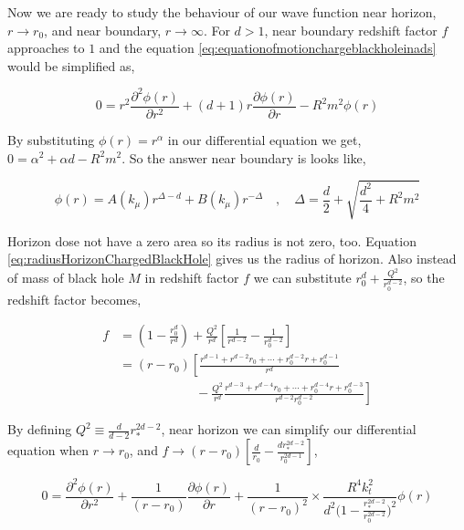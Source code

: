 Now we are ready to study the behaviour of our wave function near horizon, $r \rightarrow r_0$, and near boundary, $r \rightarrow \infty$. For $d > 1$, near boundary redshift factor $f$ approaches to $1$ and the equation \ref{eq:equationofmotionchargeblackholeinads} would be simplified as,

\begin{equation}
    0 = r^2\frac{\partial^2\phi(r)}{\partial r^2} + (d+1)r\frac{\partial \phi(r)}{\partial r} - R^2m^2\phi(r)
\end{equation}

By substituting $\phi(r) = r^\alpha$ in our differential equation we get, $0 = \alpha^2 + \alpha d -R^2m^2$. So the answer near boundary is looks like,

\begin{equation}
    \phi(r) = A(k_\mu)r^{\Delta-d} + B(k_\mu)r^{-\Delta} \quad , \quad \Delta = \frac{d}{2} + \sqrt{\frac{d^2}{4} + R^2m^2}
\end{equation}

Horizon dose not have a zero area so its radius is not zero, too. Equation \ref{eq:radiusHorizonChargedBlackHole} gives us the radius of horizon. Also instead of mass of black hole $M$ in redshift factor $f$ we can substitute $r^d_0 + \frac{Q^2}{r^{d-2}_0}$, so the redshift factor becomes,

\begin{align} \label{eq:redshiftfactorr0r*}
    f &= (1 - \frac{r^d_0}{r^d}) + \frac{Q^2}{r^d}\left[\frac{1}{r^{d-2}} - \frac{1}{r^{d-2}_0} \right] \\
      &= (r-r_0) \left[ \frac{r^{d-1} + r^{d-2}r_0 + \cdots + r^{d-2}_0r + r^{d-1}_0 }{r^d} \right. \nonumber\\
      & \qquad \qquad \qquad - \left. \frac{Q^2}{r^d}\frac{r^{d-3} + r^{d-4}r_0 + \cdots + r^{d-4}_0r + r^{d-3}_0}{r^{d-2}r^{d-2}_0} \right]
\end{align}

By defining $Q^2 \equiv \frac{d}{d-2}r^{2d-2}_*$, near horizon we can simplify our differential equation when $r \rightarrow r_0$, and $f \rightarrow (r-r_0)\left[\frac{d}{r_0} - \frac{dr^{2d-2}_*}{r^{2d-1}_0} \right]$,

\begin{equation}
    0 = \frac{\partial^2 \phi(r)}{\partial r^2} + \frac{1}{(r-r_0)}\frac{\partial \phi(r)}{\partial r} + \frac{1}{(r-r_0)^2} \times \frac{R^4k^2_t}{d^2 \big(1-\frac{r^{2d-2}_*}{r^{2d-2}_0}\big)^2}\phi(r)
\end{equation}

